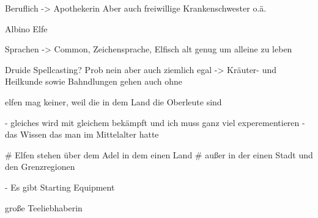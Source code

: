 Beruflich -> Apothekerin
Aber auch freiwillige Krankenschwester o.ä.

Albino Elfe

Sprachen -> Common, Zeichensprache, Elfisch
alt genug um alleine zu leben

Druide Spellcasting?
Prob nein aber auch ziemlich egal
    -> Kräuter- und Heilkunde sowie Bahndlungen gehen auch ohne

elfen mag keiner, weil die in dem Land die Oberleute sind

- gleiches wird mit gleichem bekämpft und ich muss ganz viel experementieren
- das Wissen das man im Mittelalter hatte 

# Elfen stehen über dem Adel in dem einen Land
# außer in der einen Stadt und den Grenzregionen

- Es gibt Starting Equipment


große Teeliebhaberin
